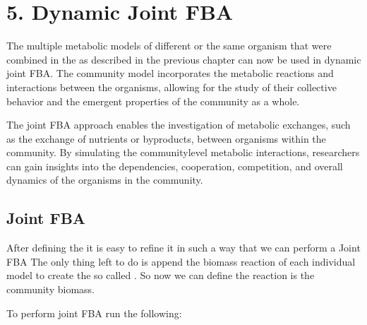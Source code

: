 \documentclass[letterpaper,10pt,english]{sphinxmanual}
\begin{document}
\sphinxstepscope


\chapter{5. Dynamic Joint FBA}
\label{\detokenize{5_djoint/home:dynamic-joint-fba}}\label{\detokenize{5_djoint/home::doc}}
\sphinxAtStartPar
The multiple metabolic models of different or the same organism that were combined in the  as described
in the previous chapter can now be used in dynamic joint FBA. The community model incorporates the metabolic reactions and
interactions between the organisms, allowing for the study of their collective behavior and the emergent properties of the
community as a whole.

\sphinxAtStartPar
The joint FBA approach enables the investigation of metabolic exchanges, such as the exchange of nutrients or byproducts,
between organisms within the community. By simulating the community\sphinxhyphen{}level metabolic interactions, researchers can gain
insights into the dependencies, cooperation, competition, and overall dynamics of the organisms in the community.


\section{Joint FBA}
\label{\detokenize{5_djoint/home:joint-fba}}
\sphinxAtStartPar
After defining the  it is easy to refine it in such a way that we can perform a Joint FBA
The only thing left to do is append the biomass reaction of each individual model to create the so called .
So now we can define the reaction  is the community biomass.

\sphinxAtStartPar
To perform joint FBA run the following:
\end{document}
